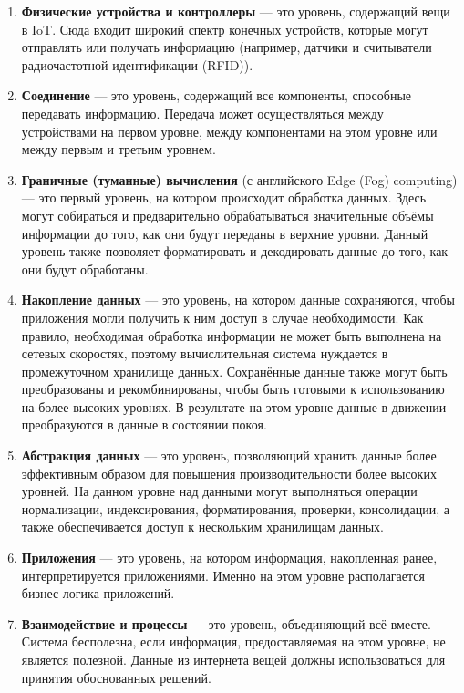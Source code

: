 \begin{enumerate}[label*=\arabic*.]
	\item \textbf{Физические устройства и контроллеры} --- это уровень, содержащий вещи в IoT. Сюда входит широкий спектр конечных устройств, которые могут отправлять или получать информацию (например, датчики и считыватели радиочастотной идентификации (RFID)).
	
	\item \textbf{Соединение} --- это уровень, содержащий все компоненты, способные передавать информацию. Передача может осуществляться между устройствами на первом уровне, между компонентами на этом уровне или между первым и третьим уровнем.
	
	\item \textbf{Граничные (туманные) вычисления} (с английского Edge (Fog) computing) --- это первый уровень, на котором происходит обработка данных. Здесь могут собираться и предварительно обрабатываться значительные объёмы информации до того, как они будут переданы в верхние уровни. Данный уровень также позволяет форматировать и декодировать данные до того, как они будут обработаны. %
	
	\item \textbf{Накопление данных} --- это уровень, на котором данные сохраняются, чтобы приложения могли получить к ним доступ в случае необходимости. Как правило, необходимая обработка информации не может быть выполнена на сетевых скоростях, поэтому вычислительная система нуждается в промежуточном хранилище данных. Сохранённые данные также могут быть преобразованы и рекомбинированы, чтобы быть готовыми к использованию на более высоких уровнях. В результате на этом уровне данные в движении преобразуются в данные в состоянии покоя.
	
	\item \textbf{Абстракция данных} --- это уровень, позволяющий хранить данные более эффективным образом для повышения производительности более высоких уровней. На данном уровне над данными могут выполняться операции нормализации, индексирования, форматирования, проверки, консолидации, а также обеспечивается доступ к нескольким хранилищам данных.
	
	\item \textbf{Приложения} --- это уровень, на котором информация, накопленная ранее, интерпретируется приложениями. Именно на этом уровне располагается бизнес-логика приложений.
	
	\item \textbf{Взаимодействие и процессы} --- это уровень, объединяющий всё вместе. Система бесполезна, если информация, предоставляемая на этом уровне, не является полезной. Данные из интернета вещей должны использоваться для принятия обоснованных решений.
	
\end{enumerate}

